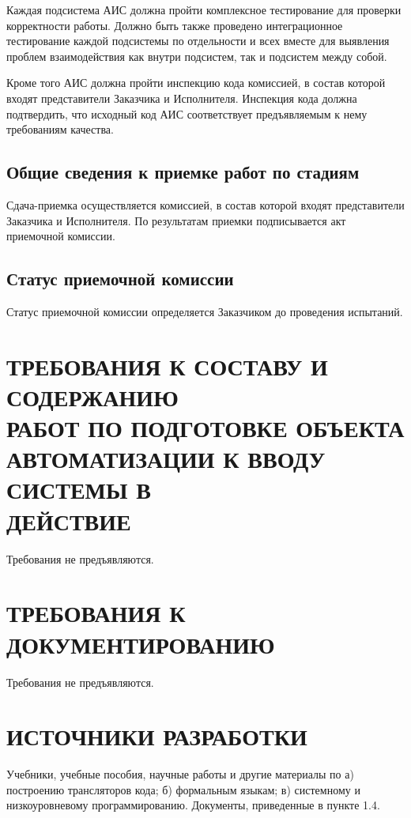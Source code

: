 \documentclass[14pt,russian]{extarticle}
\begin{document}
Каждая подсистема АИС должна пройти комплексное тестирование для проверки
корректности работы. Должно быть также проведено интеграционное тестирование
каждой подсистемы по отдельности и всех вместе для выявления проблем
взаимодействия как внутри подсистем, так и подсистем между собой.

Кроме того АИС должна пройти инспекцию кода комиссией, в состав которой входят
представители Заказчика и Исполнителя. Инспекция кода должна подтвердить, что
исходный код АИС соответствует предъявляемым к нему требованиям качества.

\subsection{Общие сведения к приемке работ по стадиям}

Сдача-приемка осуществляется комиссией, в состав которой входят представители
Заказчика и Исполнителя. По результатам приемки подписывается акт приемочной
комиссии.

\subsection{Статус приемочной комиссии}

Статус приемочной комиссии определяется Заказчиком до проведения испытаний.

\clearpage
\section{ТРЕБОВАНИЯ К СОСТАВУ И СОДЕРЖАНИЮ\\РАБОТ ПО ПОДГОТОВКЕ ОБЪЕКТА\\
АВТОМАТИЗАЦИИ К ВВОДУ СИСТЕМЫ В\\ДЕЙСТВИЕ}

Требования не предъявляются.

\clearpage
\section{ТРЕБОВАНИЯ К ДОКУМЕНТИРОВАНИЮ}

Требования не предъявляются.

\clearpage
\section{ИСТОЧНИКИ РАЗРАБОТКИ}

Учебники, учебные пособия, научные работы и другие материалы по а) построению
трансляторов кода; б) формальным языкам; в) системному и низкоуровневому
программированию. Документы, приведенные в пункте 1.4.
\end{document}
